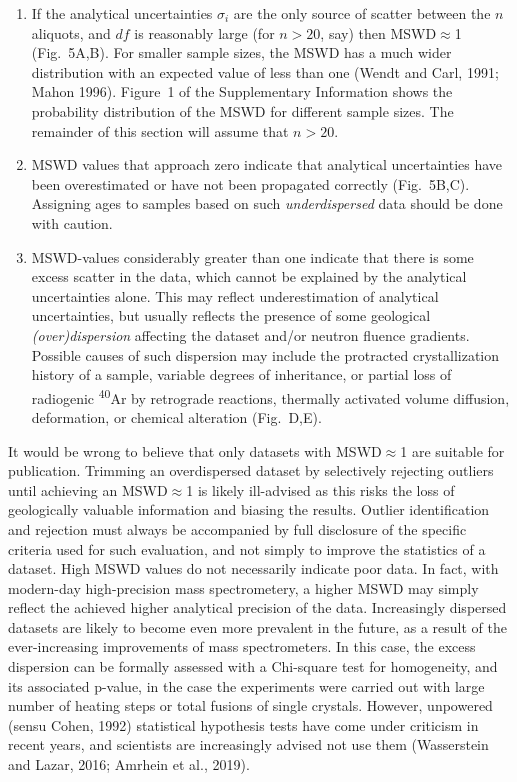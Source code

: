 \documentclass{article}
\begin{document}
\begin{enumerate}
\item If the analytical uncertainties $\sigma_i$ are the only source
  of scatter between the $n$ aliquots, and $df$ is reasonably large
  (for $n > 20$, say) then MSWD$\approx$1 (Fig.~5A,B).  For smaller
  sample sizes, the MSWD has a much wider distribution with an
  expected value of less than one (Wendt and Carl, 1991; Mahon
  1996). Figure~1 of the Supplementary Information shows the
  probability distribution of the MSWD for different sample sizes.
  The remainder of this section will assume that $n > 20$.

\item MSWD values that approach zero indicate that analytical
  uncertainties have been overestimated or have not been propagated
  correctly (Fig.~5B,C). Assigning ages to samples based on such
  \emph{underdispersed} data should be done with caution.
  
\item MSWD-values considerably greater than one indicate that there is
  some excess scatter in the data, which cannot be explained by the
  analytical uncertainties alone. This may reflect underestimation of
  analytical uncertainties, but usually reflects the presence of some
  geological \emph{(over)dispersion} affecting the dataset and/or
  neutron fluence gradients. Possible causes of such dispersion may
  include the protracted crystallization history of a sample, variable
  degrees of inheritance, or partial loss of radiogenic
  \textsuperscript{40}Ar by retrograde reactions, thermally activated
  volume diffusion, deformation, or chemical alteration (Fig.~D,E).
\end{enumerate}

It would be wrong to believe that only datasets with MSWD$\approx$1
are suitable for publication. Trimming an overdispersed dataset by
selectively rejecting outliers until achieving an MSWD$\approx$1 is
likely ill-advised as this risks the loss of geologically valuable
information and biasing the results. Outlier identification and
rejection must always be accompanied by full disclosure of the
specific criteria used for such evaluation, and not simply to improve
the statistics of a dataset. High MSWD values do not necessarily
indicate poor data. In fact, with modern-day high-precision mass
spectrometery, a higher MSWD may simply reflect the achieved higher
analytical precision of the data. Increasingly dispersed datasets are
likely to become even more prevalent in the future, as a result of the
ever-increasing improvements of mass spectrometers. In this case, the
excess dispersion can be formally assessed with a Chi-square test for
homogeneity, and its associated p-value, in the case the experiments
were carried out with large number of heating steps or total fusions
of single crystals. However, unpowered (sensu Cohen, 1992) statistical
hypothesis tests have come under criticism in recent years, and
scientists are increasingly advised not use them (Wasserstein and
Lazar, 2016; Amrhein et al., 2019).\\
\end{document}
